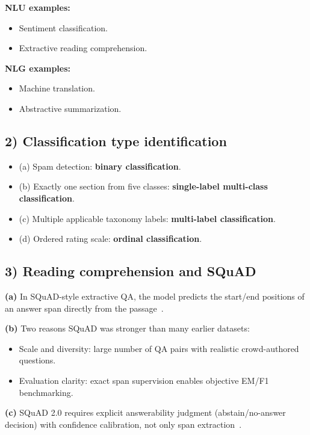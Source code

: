 \documentclass[12pt]{article}
\begin{document}
\textbf{NLU examples:}
\begin{itemize}[leftmargin=1.2em]
    \item Sentiment classification.
    \item Extractive reading comprehension.
\end{itemize}

\textbf{NLG examples:}
\begin{itemize}[leftmargin=1.2em]
    \item Machine translation.
    \item Abstractive summarization.
\end{itemize}

\subsection*{2) Classification type identification}
\begin{itemize}[leftmargin=1.2em]
    \item (a) Spam detection: \textbf{binary classification}.
    \item (b) Exactly one section from five classes: \textbf{single-label multi-class classification}.
    \item (c) Multiple applicable taxonomy labels: \textbf{multi-label classification}.
    \item (d) Ordered rating scale: \textbf{ordinal classification}.
\end{itemize}

\subsection*{3) Reading comprehension and SQuAD}
\textbf{(a)} In SQuAD-style extractive QA, the model predicts the start/end positions of an answer span directly from the passage~\cite{rajpurkar2016squad}.

\textbf{(b)} Two reasons SQuAD was stronger than many earlier datasets:
\begin{itemize}[leftmargin=1.2em]
    \item Scale and diversity: large number of QA pairs with realistic crowd-authored questions.
    \item Evaluation clarity: exact span supervision enables objective EM/F1 benchmarking.
\end{itemize}

\textbf{(c)} SQuAD 2.0 requires explicit answerability judgment (abstain/no-answer decision) with confidence calibration, not only span extraction~\cite{rajpurkar2018squad2}.
\end{document}
